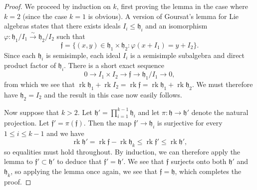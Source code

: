 \documentclass[10pt,a4paper]{amsart}
\newcommand{\mf}[1]{\mathfrak{#1}}
\newcommand{\rk}{\operatorname{rk}}
\begin{document}
\begin{proof}
We proceed by induction on $k$, first proving the lemma in the case where $k = 2$ (since the case $k=1$ is obvious).
A version of Goursat's lemma for Lie algebras states that there exists ideals $I_i \leq \mf{h}_i$ and an isomorphism $\varphi: \mf{h}_1/I_1 \xrightarrow{\sim} \mf{h}_2/I_2$ such that
\[\mf{f} = \{(x,y) \in \mf{h}_1 \times \mf{h}_2: \varphi(x + I_1) = y + I_2\}.\]
Since each $\mf{h}_i$ is semisimple, each ideal $I_i$ is a semisimple subalgebra and direct product factor of $\mf{h}_i$.
There is a short exact sequence
\[
0 \to I_1 \times I_2 \to \mf{f} \to \mf{h}_1/I_1 \to 0,
\]
from which we see that $ \rk \mf{h}_1 +  \rk I_2 =  \rk \mf{f} = \rk \mf{h}_1 + \rk \mf{h}_2 $.
We must therefore have $\mf{h}_2 = I_2$ and the result in this case now easily follows.

Now suppose that $k>2$.
Let $\mf{h}' = \prod_{i=1}^{k-1} \mf{h}_i$ and let $\pi: \mf{h} \to \mf{h}'$ denote the natural projection.
Let $\mf{f}' = \pi(\mf{f})$.
Then the map $\mf{f}' \to \mf{h}_i$ is surjective for every $1 \leq i \leq k-1$ and we have \[ \rk \mf{h}' = \rk \mf{f} - \rk \mf{h}_k \leq \rk \mf{f'} \leq \rk \mf{h'},\]
so equalities must hold throughout.
By induction, we can therefore apply the lemma to $\mf{f}' \subset \mf{h}'$ to deduce that $\mf{f}' = \mf{h}'$.
We see that $\mf{f}$ surjects onto both $\mf{h}'$ and $\mf{h}_k$, so applying the lemma once again, we see that $\mf{f} = \mf{h}$, which completes the proof.
\end{proof}
\end{document}
